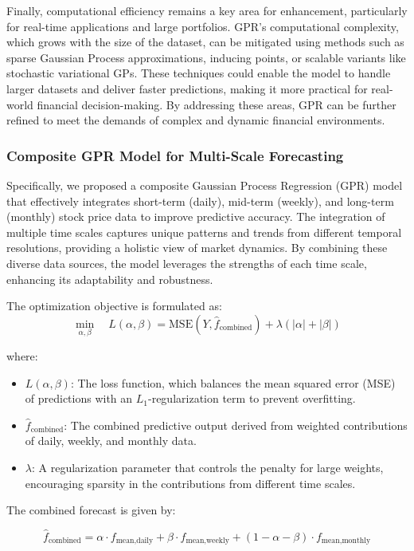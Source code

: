 Finally, computational efficiency remains a key area for enhancement, particularly for real-time applications and large portfolios. 
GPR's computational complexity, which grows with the size of the dataset, can be mitigated using methods such as sparse Gaussian Process approximations, inducing points, or scalable variants like stochastic variational GPs. 
These techniques could enable the model to handle larger datasets and deliver faster predictions, making it more practical for real-world financial decision-making. 
By addressing these areas, GPR can be further refined to meet the demands of complex and dynamic financial environments.

\subsubsection{Composite \ac{GPR} Model for Multi-Scale Forecasting}
Specifically, we proposed a composite Gaussian Process Regression (GPR) model that effectively integrates short-term (daily), mid-term (weekly), and long-term (monthly) stock price data to improve predictive accuracy. 
The integration of multiple time scales captures unique patterns and trends from different temporal resolutions, providing a holistic view of market dynamics. 
By combining these diverse data sources, the model leverages the strengths of each time scale, enhancing its adaptability and robustness.

The optimization objective is formulated as:
\[
\min_{\alpha, \beta} \quad L(\alpha, \beta) = \text{MSE}\left(Y, \hat{f}_{\text{combined}}\right) + \lambda \left( |\alpha| + |\beta| \right)
\]

where:
\begin{itemize}
    \item $L(\alpha, \beta)$: The loss function, which balances the mean squared error (MSE) of predictions with an $L_1$-regularization term to prevent overfitting.
    \item $\hat{f}_{\text{combined}}$: The combined predictive output derived from weighted contributions of daily, weekly, and monthly data.
    \item $\lambda$: A regularization parameter that controls the penalty for large weights, encouraging sparsity in the contributions from different time scales.
\end{itemize}

The combined forecast is given by:

\[
\hat{f}_{\text{combined}} = \alpha \cdot f_{\text{mean,daily}} + \beta \cdot f_{\text{mean,weekly}} + (1 - \alpha - \beta) \cdot f_{\text{mean,monthly}}
\]

